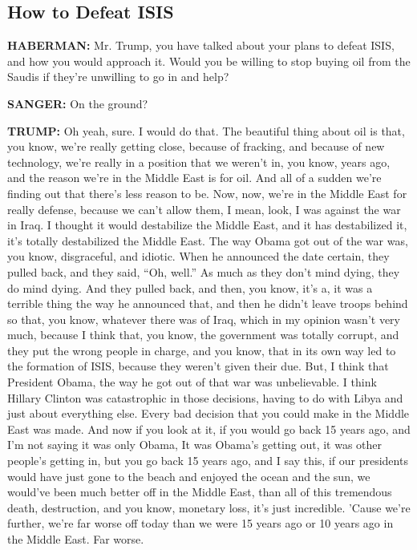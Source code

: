 \hypertarget{how-to-defeat-isis}{%
\subsection{How to Defeat ISIS}\label{how-to-defeat-isis}}

\textbf{HABERMAN:} Mr. Trump, you have talked about your plans to defeat
ISIS, and how you would approach it. Would you be willing to stop buying
oil from the Saudis if they're unwilling to go in and help?

\textbf{SANGER:} On the ground?

\textbf{TRUMP:} Oh yeah, sure. I would do that. The beautiful thing
about oil is that, you know, we're really getting close, because of
fracking, and because of new technology, we're really in a position that
we weren't in, you know, years ago, and the reason we're in the Middle
East is for oil. And all of a sudden we're finding out that there's less
reason to be. Now, now, we're in the Middle East for really defense,
because we can't allow them, I mean, look, I was against the war in
Iraq. I thought it would destabilize the Middle East, and it has
destabilized it, it's totally destabilized the Middle East. The way
Obama got out of the war was, you know, disgraceful, and idiotic. When
he announced the date certain, they pulled back, and they said, ``Oh,
well.'' As much as they don't mind dying, they do mind dying. And they
pulled back, and then, you know, it's a, it was a terrible thing the way
he announced that, and then he didn't leave troops behind so that, you
know, whatever there was of Iraq, which in my opinion wasn't very much,
because I think that, you know, the government was totally corrupt, and
they put the wrong people in charge, and you know, that in its own way
led to the formation of ISIS, because they weren't given their due. But,
I think that President Obama, the way he got out of that war was
unbelievable. I think Hillary Clinton was catastrophic in those
decisions, having to do with Libya and just about everything else. Every
bad decision that you could make in the Middle East was made. And now if
you look at it, if you would go back 15 years ago, and I'm not saying it
was only Obama, It was Obama's getting out, it was other people's
getting in, but you go back 15 years ago, and I say this, if our
presidents would have just gone to the beach and enjoyed the ocean and
the sun, we would've been much better off in the Middle East, than all
of this tremendous death, destruction, and you know, monetary loss, it's
just incredible. 'Cause we're further, we're far worse off today than we
were 15 years ago or 10 years ago in the Middle East. Far worse.

